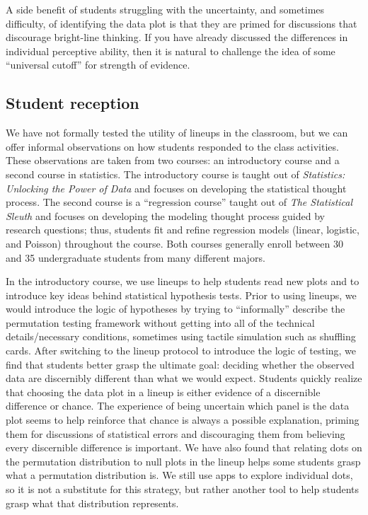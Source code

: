 \documentclass[12pt]{article}
\begin{document}
A side benefit of students struggling with the uncertainty, and
sometimes difficulty, of identifying the data plot is that they are
primed for discussions that discourage bright-line thinking. If you have
already discussed the differences in individual perceptive ability, then
it is natural to challenge the idea of some ``universal cutoff'' for
strength of evidence.

\hypertarget{student-reception}{%
\subsection{Student reception}\label{student-reception}}

We have not formally tested the utility of lineups in the classroom, but
we can offer informal observations on how students responded to the
class activities. These observations are taken from two courses: an
introductory course and a second course in statistics. The introductory
course is taught out of \emph{Statistics: Unlocking the Power of Data}
\citep{Lock2017} and focuses on developing the statistical thought
process. The second course is a ``regression course'' taught out of
\emph{The Statistical Sleuth} \citep{ramsey2013} and focuses on
developing the modeling thought process guided by research questions;
thus, students fit and refine regression models (linear, logistic, and
Poisson) throughout the course. Both courses generally enroll between 30
and 35 undergraduate students from many different majors.

In the introductory course, we use lineups to help students read new
plots and to introduce key ideas behind statistical hypothesis tests.
Prior to using lineups, we would introduce the logic of hypotheses by
trying to ``informally'' describe the permutation testing framework
without getting into all of the technical details/necessary conditions,
sometimes using tactile simulation such as shuffling cards. After
switching to the lineup protocol to introduce the logic of testing, we
find that students better grasp the ultimate goal: deciding whether the
observed data are discernibly different than what we would expect.
Students quickly realize that choosing the data plot in a lineup is
either evidence of a discernible difference or chance. The experience of
being uncertain which panel is the data plot seems to help reinforce
that chance is always a possible explanation, priming them for
discussions of statistical errors and discouraging them from believing
every discernible difference is important. We have also found that
relating dots on the permutation distribution to null plots in the
lineup helps some students grasp what a permutation distribution is. We
still use apps to explore individual dots, so it is not a substitute for
this strategy, but rather another tool to help students grasp what that
distribution represents.
\end{document}
